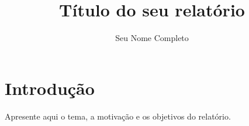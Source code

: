 \documentclass[12pt,a4paper,oneside]{book}
\title{Título do seu relatório}
\author{Seu Nome Completo}
\begin{document}
\frontmatter

\maketitle

\folhaaprovacao

\makeabstracts


\tableofcontents

\mainmatter


\chapter{Introdução}\label{cap:introducao}

Apresente aqui o tema, a motivação e os objetivos do relatório.
\end{document}
